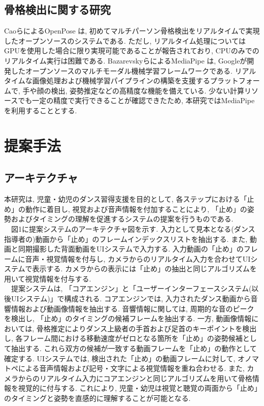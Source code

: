 \documentclass[paper]{ieicej}
\begin{document}
\subsection{骨格検出に関する研究}
CaoらによるOpenPose \cite{ref23}は, 初めてマルチパーソン骨格検出をリアルタイムで実現したオープンソースのシステムである. ただし, リアルタイム処理についてはGPUを使用した場合に限り実現可能であることが報告されており, CPUのみでのリアルタイム実行は困難である. BazarevskyらによるMediaPipe \cite{ref24}は, Googleが開発したオープンソースのマルチモーダル機械学習フレームワークである. リアルタイムな画像処理および機械学習パイプラインの構築を支援するプラットフォームで, 手や顔の検出, 姿勢推定などの高精度な機能を備えている. 少ない計算リソースでも一定の精度で実行できることが確認できたため, 本研究ではMediaPipeを利用することとする.
\section{提案手法}
\subsection{アーキテクチャ}
本研究は, 児童・幼児のダンス習得支援を目的として, 各ステップにおける「止め」の動作に着目し, 視覚および音声情報を付加することにより, 「止め」の姿勢およびタイミングの理解を促進するシステムの提案を行うものである. \\
　図1に提案システムのアーキテクチャ図を示す. 入力として見本となる(ダンス指導者の)動画から「止め」のフレームインデックスリストを抽出する. また, 動画と同期撮影した背面動画をUIシステムで入力する. 入力動画の「止め」のフレームに音声・視覚情報を付与し, カメラからのリアルタイム入力を合わせてUIシステムで表示する. カメラからの表示には「止め」の抽出と同じアルゴリズムを用いて視覚情報を付与する. \\
　提案システムは, 「コアエンジン」と「ユーザーインターフェースシステム(以後UIシステム)」で構成される. コアエンジンでは, 入力されたダンス動画から音響情報および動画像情報を抽出する. 音響情報に関しては, 周期的な音のピークを検出し, 「止め」のタイミングの候補フレームを抽出する. 一方, 動画像情報においては, 骨格推定によりダンス上級者の手首および足首のキーポイントを検出し, 各フレーム間における移動速度がゼロとなる箇所を「止め」の姿勢候補として抽出する. これら双方の候補が一致する動画フレームを「止め」の動作として確定する. UIシステムでは, 検出された「止め」の動画フレームに対して, オノマトペによる音声情報および記号・文字による視覚情報を重ね合わせる. また, カメラからのリアルタイム入力にコアエンジンと同じアルゴリズムを用いて骨格情報を視覚的に付与する. これにより, 児童・幼児は視覚と聴覚の両面から「止め」のタイミングと姿勢を直感的に理解することが可能となる. 
\end{document}
